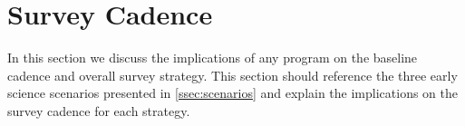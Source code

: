 \section{Survey Cadence}

In this section we discuss the implications of any \es program on the  baseline cadence and overall survey strategy. 
This section should reference the three early science scenarios presented in \ref{ssec:scenarios} and explain the implications on the survey cadence for each strategy. 

